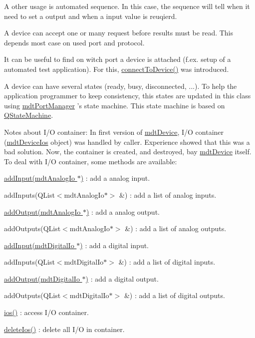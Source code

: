 A other usage is automated sequence. In this case, the sequence will tell when it need to set a output and when a input value is reuqierd.

A device can accept one or many request before results must be read. This depends most case on used port and protocol.

It can be useful to find on witch port a device is attached (f.\-ex. setup of a automated test application). For this, \hyperlink{classmdt_device_abab1b6e45af527880ce469ae318474c0}{connect\-To\-Device()} was introduced.

A device can have several states (ready, busy, disconnected, ...). To help the application programmer to keep consistency, this states are updated in this class using \hyperlink{classmdt_port_manager}{mdt\-Port\-Manager} 's state machine. This state machine is based on \hyperlink{class_q_state_machine}{Q\-State\-Machine}.

Notes about I/\-O container\-: In first version of \hyperlink{classmdt_device}{mdt\-Device}, I/\-O container (\hyperlink{classmdt_device_ios}{mdt\-Device\-Ios} object) was handled by caller. Experience showed that this was a bad solution. Now, the container is created, and destroyed, bay \hyperlink{classmdt_device}{mdt\-Device} itself. To deal with I/\-O container, some methods are available\-:
\begin{DoxyItemize}
\item \hyperlink{classmdt_device_ae887c9c83fa090c16717d75905e1079d}{add\-Input(mdt\-Analog\-Io $\ast$)} \-: add a analog input.
\item add\-Inputs(\-Q\-List$<$mdt\-Analog\-Io$\ast$$>$ \&) \-: add a list of analog inputs.
\item \hyperlink{classmdt_device_a7acf4cc331c003fd6d30190d54242da1}{add\-Output(mdt\-Analog\-Io $\ast$)} \-: add a analog output.
\item add\-Outputs(\-Q\-List$<$mdt\-Analog\-Io$\ast$$>$ \&) \-: add a list of analog outputs.
\item \hyperlink{classmdt_device_a186861ad3b8857ba045534244fb9f9ef}{add\-Input(mdt\-Digital\-Io $\ast$)} \-: add a digital input.
\item add\-Inputs(\-Q\-List$<$mdt\-Digital\-Io$\ast$$>$ \&) \-: add a list of digital inputs.
\item \hyperlink{classmdt_device_a319cd0eeec028f3fc8cfcb96def79404}{add\-Output(mdt\-Digital\-Io $\ast$)} \-: add a digital output.
\item add\-Outputs(\-Q\-List$<$mdt\-Digital\-Io$\ast$$>$ \&) \-: add a list of digital outputs.
\item \hyperlink{classmdt_device_adb7099877ad2080961fae5a40117e9e5}{ios()} \-: access I/\-O container.
\item \hyperlink{classmdt_device_a61032f15e601eb1bd74da80014bae593}{delete\-Ios()} \-: delete all I/\-O in container. 
\end{DoxyItemize}

